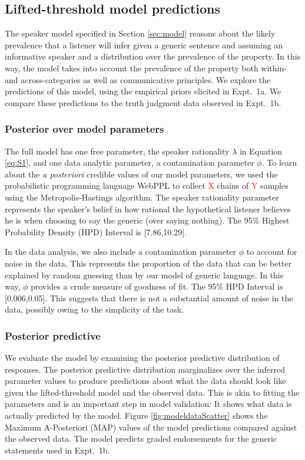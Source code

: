 \documentclass[10pt,letterpaper]{article}
\newcommand{\red}[1]{\textcolor{Red}{#1}}
\begin{document}
\subsection{Lifted-threshold model predictions}

The speaker model specified in Section \ref{sec:model} reasons about the likely prevalence that a listener will infer given  a generic sentence and assuming an informative speaker and a distribution over the prevalence of the property. 
In this way, the model takes into account the prevalence of the property both within- and across-categories as well as communicative principles.
We explore the predictions of this model, using the empirical priors elicited in Expt.~1a. 
We compare these predictions to the truth judgment data observed in Expt.~1b.

\subsubsection{Posterior over model parameters}

The full model has one free parameter, the speaker rationality $\lambda$ in Equation \ref{eq:S1}, and one data analytic parameter, a contamination parameter $\phi$.
To learn about the \emph{a posteriori} credible values of our model parameters, we used the probabilistic programming language WebPPL \cite{dippl} to collect \red{X} chains of \red{Y} samples using the Metropolis-Hastings algorithm. 
The speaker rationality parameter represents the speaker's belief in how rational the hypothetical listener believes he is when choosing to say the generic (over saying nothing). 
The 95\% Highest Probability Density (HPD) Interval is [7.86,10.29].

In the data analysis, we also include a contamination parameter $\phi$ to account for noise in the data.  
This represents the proportion of the data that can be better explained by random guessing than by our model of generic language.
In this way, $\phi$ provides a crude measure of goodness of fit. 
The 95\% HPD Interval is [0.006,0.05]. 
This suggests that there is not a substantial amount of noise in the data, possibly owing to the simplicity of the task. 


\subsubsection{Posterior predictive}

We evaluate the model by examining the posterior predictive distribution of responses. The posterior predictive distribution marginalizes over the inferred parameter values to produce predictions about what the data should look like given the lifted-threshold model and the observed data. This is akin to fitting the parameters and is an important step in model validation: It shows what data is actually predicted by the model. 
Figure \ref{fig:modeldataScatter} shows the Maximum A-Posteriori (MAP) values of the model predictions compared against the observed data. 
The model predicts graded endorsements for the generic statements used in Expt.~1b. 
\end{document}
